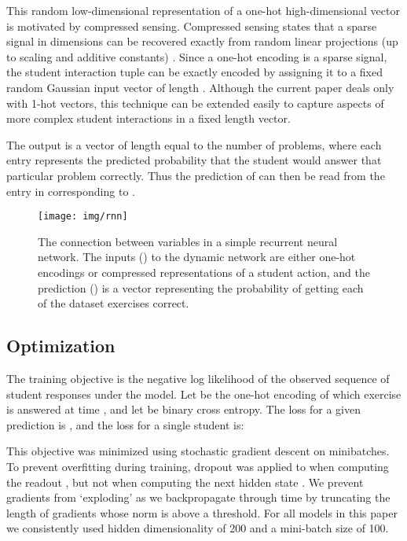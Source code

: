 \documentclass{article} \usepackage{nips,times}
\begin{document}
This random low-dimensional representation of a one-hot high-dimensional vector is motivated by compressed sensing.
Compressed sensing states that a sparse signal in  dimensions can be recovered exactly from  random linear projections (up to scaling and additive constants) \cite{baraniuk2007compressive}. Since a one-hot encoding is a sparse signal, the student interaction tuple can be exactly encoded by assigning it to a fixed random Gaussian input vector of length .
Although the current paper deals only with 1-hot vectors, this technique can be extended easily to capture aspects of more complex student interactions in a fixed length vector.


The output  is a vector of length equal to the number of problems, where each entry represents the predicted probability that the student would answer that particular problem correctly.
Thus the prediction of  can then be read from the entry in  corresponding to .


\begin{figure}[t]
\begin{center}
\texttt{[image: img/rnn]}
\end{center}
\caption{The connection between variables in a simple recurrent neural network. The inputs () to the dynamic network are either one-hot encodings or compressed representations of a student action, and the prediction () is a vector representing the probability of getting each of the dataset exercises correct.
\label{fig:rnn}
}
\vspace{-3mm}
\end{figure}

\subsection{Optimization}

The training objective is the negative log likelihood of the observed sequence of student responses under the model. Let  be the one-hot encoding of which exercise is answered at time , and let  be binary cross entropy. The loss for a given prediction is , and the loss for a single student is:
 
This objective was minimized using stochastic gradient descent on minibatches.
To prevent overfitting during training, dropout was applied to  when computing the readout , but not when computing the next hidden state .
We prevent gradients from `exploding' as we backpropagate through time by truncating the length of gradients whose norm is above a threshold. For all models in this paper we consistently used hidden dimensionality of 200 and a mini-batch size of 100. 
\end{document}
